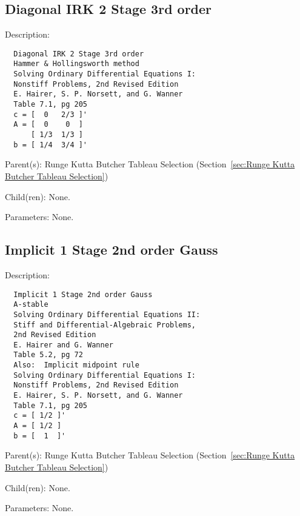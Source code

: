 \subsection{Diagonal IRK 2 Stage 3rd order}
\label{sec:Diagonal IRK 2 Stage 3rd order}

\begin{list}{}
  {\setlength{\leftmargin}{1.0in}
   \setlength{\labelwidth}{0.75in}
   \setlength{\labelsep}{0.125in}}
  \item[Description:]
\begin{verbatim}
  Diagonal IRK 2 Stage 3rd order
  Hammer & Hollingsworth method
  Solving Ordinary Differential Equations I:
  Nonstiff Problems, 2nd Revised Edition
  E. Hairer, S. P. Norsett, and G. Wanner
  Table 7.1, pg 205
  c = [  0   2/3 ]'
  A = [  0    0  ]
      [ 1/3  1/3 ]
  b = [ 1/4  3/4 ]'
\end{verbatim}
  \item[Parent(s):]
    Runge Kutta Butcher Tableau Selection (Section~\ref{sec:Runge Kutta Butcher Tableau Selection})
  \item[Child(ren):]
    None. 
  \item[Parameters:]
    None. 
\end{list}

\subsection{Implicit 1 Stage 2nd order Gauss}
\label{sec:Implicit 1 Stage 2nd order Gauss}

\begin{list}{}
  {\setlength{\leftmargin}{1.0in}
   \setlength{\labelwidth}{0.75in}
   \setlength{\labelsep}{0.125in}}
  \item[Description:]
\begin{verbatim}
  Implicit 1 Stage 2nd order Gauss
  A-stable
  Solving Ordinary Differential Equations II:
  Stiff and Differential-Algebraic Problems,
  2nd Revised Edition
  E. Hairer and G. Wanner
  Table 5.2, pg 72
  Also:  Implicit midpoint rule
  Solving Ordinary Differential Equations I:
  Nonstiff Problems, 2nd Revised Edition
  E. Hairer, S. P. Norsett, and G. Wanner
  Table 7.1, pg 205
  c = [ 1/2 ]'
  A = [ 1/2 ]
  b = [  1  ]'
\end{verbatim}
  \item[Parent(s):]
    Runge Kutta Butcher Tableau Selection (Section~\ref{sec:Runge Kutta Butcher Tableau Selection})
  \item[Child(ren):]
    None. 
  \item[Parameters:]
    None. 
\end{list}

